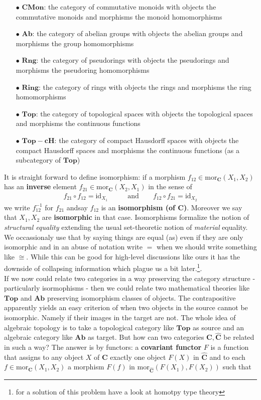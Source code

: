 \begin{enumerate}
\item[$\bullet$]
  $\mathbf{CMon}$: the category of commutative monoids with objects the commutative monoids and morphisms the monoid homomorphisms
\item[$\bullet$]
  $\mathbf{Ab}$: the category of abelian groups with objects the abelian groups and morphisms the group homomorphisms
\item[$\bullet$]
  $\mathbf{Rng}$: the category of pseudorings with objects the pseudorings and morphisms the pseudoring homomorphisms
\item[$\bullet$]
  $\mathbf{Ring}$: the category of rings with objects the rings and morphisms the ring homomorphisms
\item[$\bullet$]
  $\mathbf{Top}$: the category of topological spaces with objects the topological spaces and morphisms the continuous functions
\item[$\bullet$]
  $\mathbf{Top-cH}$: the category of compact Hausdorff spaces with objects the compact Hausdorff spaces and morphisms the continuous functions (as a subcategory of $\mathbf{Top}$)
\end{enumerate}
It is straight forward to define isomorphism: if a morphism $f_{12} \in \mathrm{mor}_{\mathbf{C}}(X_{1},X_{2})$ has an \textbf{inverse} element $f_{21} \in \mathrm{mor}_{\mathbf{C}}(X_{2},X_{1})$ in the sense of
\begin{align*}
  f_{21}
  \circ
  f_{12}
  =
  \mathrm{id}_{X_{1}}
  \qquad
  &\text{and}
  \qquad
  f_{12}
  \circ
  f_{21}
  =
  \mathrm{id}_{X_{2}}
\end{align*}
we write $f_{12}^{-1}$ for $f_{21}$ andsay $f_{12}$ is an \textbf{isomorphism (of $\mathbf{C}$)}. Moreover we say that $X_{1},X_{2}$ are \textbf{isomorphic} in that case. Isomorphisms formalize the notion of \textit{structural equality} extending the usual set-theoretic notion of \textit{material} equality. We occassionaly use that by saying things are {\glqq}equal (as){\grqq} even if they are only isomorphic and in an abuse of notation write $=$ when we should write something like $\cong$. While this can be good for high-level discussions like ours it has the downside of collapsing information which plague us a bit later.\footnote{for a solution of this problem have a look at homotpy type theory}.
\\
If we now could relate two categories in a way preserving the category structure - particularly isormophisms - then we could relate two mathematical theories like $\mathbf{Top}$ and $\mathbf{Ab}$ preserving isomorphism classes of objects. The contrapositive apparently yields an easy criterion of when two objects in the source cannot be isomorphic. Namely if their images in the target are not. The whole idea of algebraic topology is to take a topological category like $\mathbf{Top}$ as source and an algebraic category like $\mathbf{Ab}$ as target. But how can two categories $\mathbf{C},\hat{\mathbf{C}}$ be related in such a way? The answer is by functors: a \textbf{covariant functor} $F$ is a function that assigns to any object $X$ of $\mathbf{C}$ exactly one object $F(X)$ in $\hat{\mathbf{C}}$ and to each $f \in \mathrm{mor}_{\mathbf{C}}(X_{1},X_{2})$ a morphism $F(f)$ in $\mathrm{mor}_{\hat{\mathbf{C}}}(F(X_{1}),F(X_{2}))$ such that
